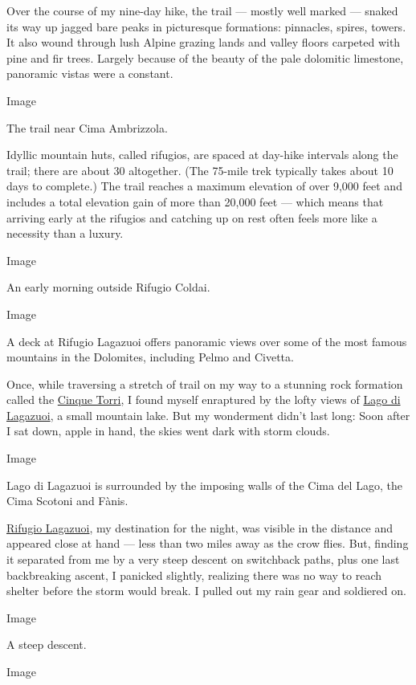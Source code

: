 Over the course of my nine-day hike, the trail --- mostly well marked
--- snaked its way up jagged bare peaks in picturesque formations:
pinnacles, spires, towers. It also wound through lush Alpine grazing
lands and valley floors carpeted with pine and fir trees. Largely
because of the beauty of the pale dolomitic limestone, panoramic vistas
were a constant.

Image

The trail near Cima Ambrizzola.

Idyllic mountain huts, called rifugios, are spaced at day-hike intervals
along the trail; there are about 30 altogether. (The 75-mile trek
typically takes about 10 days to complete.) The trail reaches a maximum
elevation of over 9,000 feet and includes a total elevation gain of more
than 20,000 feet --- which means that arriving early at the rifugios and
catching up on rest often feels more like a necessity than a luxury.

Image

An early morning outside Rifugio Coldai.

Image

A deck at Rifugio Lagazuoi offers panoramic views over some of the most
famous mountains in the Dolomites, including Pelmo and Civetta.

Once, while traversing a stretch of trail on my way to a stunning rock
formation called the
\href{https://www.lonelyplanet.com/italy/cinque-torri}{Cinque Torri}, I
found myself enraptured by the lofty views of
\href{https://goo.gl/maps/CXjADMPCPTcKYEKM8}{Lago di Lagazuoi}, a small
mountain lake. But my wonderment didn't last long: Soon after I sat
down, apple in hand, the skies went dark with storm clouds.

Image

Lago di Lagazuoi is surrounded by the imposing walls of the Cima del
Lago, the Cima Scotoni and Fànis.

\href{https://www.rifugiolagazuoi.com/index_en.php}{Rifugio Lagazuoi},
my destination for the night, was visible in the distance and appeared
close at hand --- less than two miles away as the crow flies. But,
finding it separated from me by a very steep descent on switchback
paths, plus one last backbreaking ascent, I panicked slightly, realizing
there was no way to reach shelter before the storm would break. I pulled
out my rain gear and soldiered on.

Image

A steep descent.

Image

